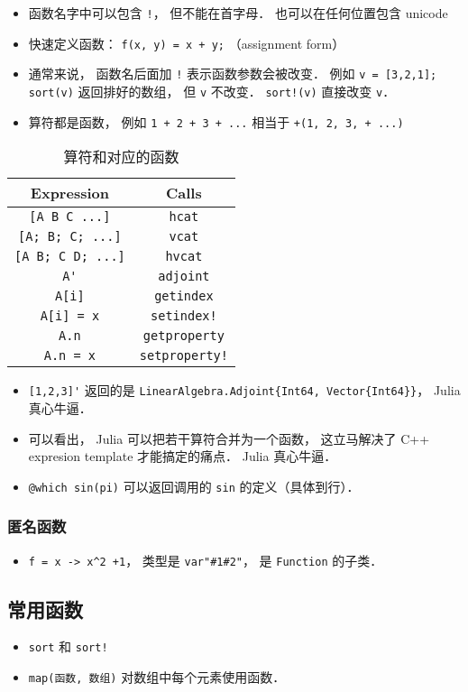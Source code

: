 
\begin{issues}
\issueDraft
\end{issues}

\begin{itemize}
\item 函数名字中可以包含 \verb|!|， 但不能在首字母． 也可以在任何位置包含 unicode
\item 快速定义函数： \verb|f(x, y) = x + y;| （assignment form）
\item 通常来说， 函数名后面加 \verb|!| 表示函数参数会被改变． 例如 \verb|v = [3,2,1]; sort(v)| 返回排好的数组， 但 \verb|v| 不改变． \verb|sort!(v)| 直接改变 \verb|v|．
\item 算符都是函数， 例如 \verb|1 + 2 + 3 + ...| 相当于 \verb|+(1, 2, 3, + ...)|
\end{itemize}


\begin{table}[ht]
\centering
\caption{算符和对应的函数}\label{JuFunc_tab1}
\begin{tabular}{|c|c|}
\hline
Expression & Calls \\
\hline
\verb|[A B C ...]| & \verb|hcat| \\
\hline
\verb|[A; B; C; ...]| & \verb|vcat| \\
\hline
\verb|[A B; C D; ...]| & \verb|hvcat| \\
\hline
\verb|A'| & \verb|adjoint| \\
\hline
\verb|A[i]| & \verb|getindex| \\
\hline
\verb|A[i] = x| & \verb|setindex!| \\
\hline
\verb|A.n| & \verb|getproperty| \\
\hline
\verb|A.n = x| & \verb|setproperty!| \\
\hline
\end{tabular}
\end{table}

\begin{itemize}
\item \verb|[1,2,3]'| 返回的是 \verb|LinearAlgebra.Adjoint{Int64, Vector{Int64}}|， Julia 真心牛逼．
\item 可以看出， Julia 可以把若干算符合并为一个函数， 这立马解决了 C++ expresion template 才能搞定的痛点． Julia 真心牛逼．
\item \verb|@which sin(pi)| 可以返回调用的 \verb|sin| 的定义（具体到行）．
\end{itemize}

\subsubsection{匿名函数}
\begin{itemize}
\item \verb|f = x -> x^2 +1|， 类型是 \verb|var"#1#2"|， 是 \verb|Function| 的子类．
\end{itemize}

\subsection{常用函数}
\begin{itemize}
\item \verb|sort| 和 \verb|sort!|
\item \verb|map(函数, 数组)| 对数组中每个元素使用函数．
\end{itemize}
